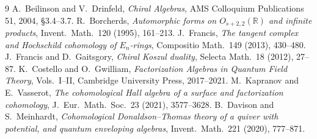 \documentclass[11pt]{amsart}
\providecommand{\R}{\mathbb{R}}
\theoremstyle{plain}
\theoremstyle{definition}
\theoremstyle{remark}
\begin{document}
\begin{thebibliography}{9}
 A.~Beilinson and V.~Drinfeld, \emph{Chiral Algebras},
  AMS Colloquium Publications 51, 2004, \S3.4--3.7.
 R.~Borcherds, \emph{Automorphic forms on
  $O_{s+2,2}(\R)$ and infinite products}, Invent.\ Math.\ 120 (1995),
  161--213.
 J.~Francis, \emph{The tangent complex and
  Hochschild cohomology of $E_n$-rings}, Compositio Math.\ 149 (2013),
  430--480.
 J.~Francis and D.~Gaitsgory,
  \emph{Chiral Koszul duality}, Selecta Math.\ 18 (2012), 27--87.
  K.~Costello and O.~Gwilliam, \emph{Factorization Algebras in Quantum
  Field Theory}, Vols.~I--II, Cambridge University Press, 2017--2021.
  M.~Kapranov and E.~Vasserot, \emph{The cohomological Hall algebra of
  a surface and factorization cohomology}, J.\ Eur.\ Math.\ Soc.\ 23
  (2021), 3577--3628.
 B.~Davison and S.~Meinhardt,
  \emph{Cohomological Donaldson--Thomas theory of a quiver with
  potential, and quantum enveloping algebras}, Invent.\ Math.\ 221
  (2020), 777--871.
\end{thebibliography}
\end{document}
